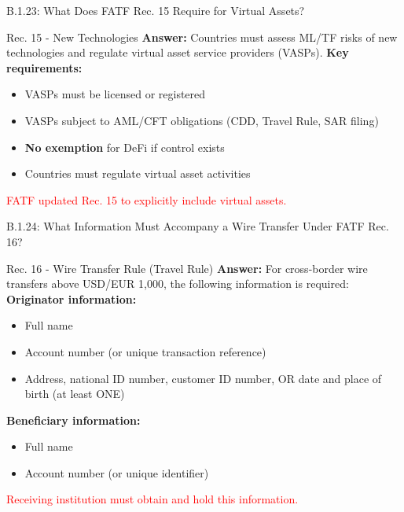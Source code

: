 \documentclass{beamer}
\begin{document}
	\begin{frame}{B.1.23: What Does FATF Rec. 15 Require for Virtual Assets?}
		\begin{block}{Rec. 15 - New Technologies}
			\textbf{Answer:} Countries must assess ML/TF risks of new technologies and regulate virtual asset service providers (VASPs).
			\vspace{0.2cm}
			\textbf{Key requirements:}
			\begin{itemize}
				\item VASPs must be licensed or registered
				\item VASPs subject to AML/CFT obligations (CDD, Travel Rule, SAR filing)
				\item \textbf{No exemption} for DeFi if control exists
				\item Countries must regulate virtual asset activities
			\end{itemize}
			\textcolor{red}{FATF updated Rec. 15 to explicitly include virtual assets.}
		\end{block}
	\end{frame}
	
	\begin{frame}{B.1.24: What Information Must Accompany a Wire Transfer Under FATF Rec. 16?}
		\begin{block}{Rec. 16 - Wire Transfer Rule (Travel Rule)}
			\textbf{Answer:} For cross-border wire transfers above USD/EUR 1,000, the following information is required:
			\vspace{0.2cm}
			\textbf{Originator information:}
			\begin{itemize}
				\item Full name
				\item Account number (or unique transaction reference)
				\item Address, national ID number, customer ID number, OR date and place of birth (at least ONE)
			\end{itemize}
			\textbf{Beneficiary information:}
			\begin{itemize}
				\item Full name
				\item Account number (or unique identifier)
			\end{itemize}
			\textcolor{red}{Receiving institution must obtain and hold this information.}
		\end{block}
	\end{frame}
	
\end{document}

